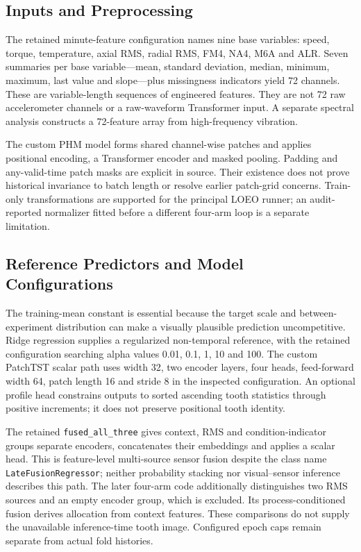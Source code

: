 \subsection{Inputs and Preprocessing}
The retained minute-feature configuration names nine base variables: speed, torque,
temperature, axial RMS, radial RMS, FM4, NA4, M6A and ALR. Seven summaries per base
variable---mean, standard deviation, median, minimum, maximum, last value and
slope---plus missingness indicators yield 72 channels. These are variable-length
sequences of engineered features. They are not 72 raw accelerometer channels or a
raw-waveform Transformer input. A separate spectral analysis constructs a 72-feature
array from high-frequency vibration.

The custom PHM model forms shared channel-wise patches and applies positional encoding,
a Transformer encoder and masked pooling. Padding and any-valid-time patch masks are
explicit in source. Their existence does not prove historical invariance to batch length
or resolve earlier patch-grid concerns. Train-only transformations are supported for the
principal LOEO runner; an audit-reported normalizer fitted before a different four-arm
loop is a separate limitation.

\subsection{Reference Predictors and Model Configurations}
The training-mean constant is essential because the target scale and between-experiment
distribution can make a visually plausible prediction uncompetitive. Ridge regression
supplies a regularized non-temporal reference, with the retained configuration searching
alpha values 0.01, 0.1, 1, 10 and 100. The custom PatchTST scalar path uses width 32,
two encoder layers, four heads, feed-forward width 64, patch length 16 and stride 8 in
the inspected configuration. An optional profile head constrains outputs to sorted
ascending tooth statistics through positive increments; it does not preserve positional
tooth identity.

The retained \texttt{fused\_all\_three} gives context, RMS and condition-indicator
groups separate encoders, concatenates their embeddings and applies a scalar head. This
is feature-level multi-source sensor fusion despite the class name
\texttt{LateFusionRegressor}; neither probability stacking nor visual--sensor inference
describes this path. The later four-arm code additionally distinguishes two RMS sources
and an empty encoder group, which is excluded. Its process-conditioned fusion derives
allocation from context features. These comparisons do not supply the unavailable
inference-time tooth image. Configured epoch caps remain separate from actual fold
histories.

